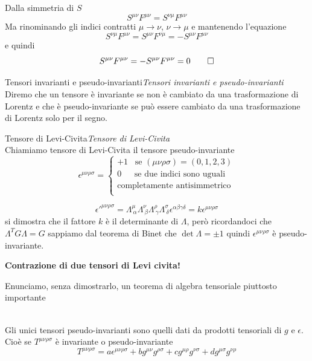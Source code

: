 \documentclass[12pt,a4paper,titlepage, twoside, openright]{book}
\newenvironment{proof:}[1][\proofname]{  %
 \begin{tcolorbox}[
	breakable, 
	enhanced, 
	interior hidden, 
	frame hidden, 
	borderline west = {1pt}{0pt}{gray}, 
	top=0pt, bottom=0pt, left=0pt]
\begin{proof}[#1:]~
}
{
\end{proof}
\end{tcolorbox}
}
\newenvironment{definizione}[1][\empty]{\begin{Definizione}{
\ifx\empty#1\relax\else\mdseries\itshape#1\\\fi
}{}}{\end{Definizione}}
\newenvironment{teorema}[1][\empty]{\begin{Teorema}{
\ifx\empty#1\relax\else\mdseries\itshape#1\\\fi
}{}}{\end{Teorema}}
\numberwithin{equation}{chapter}
\begin{document}
\begin{proof:}
Dalla simmetria di $S$ 
\[
S^{\mu\nu}F^{\mu\nu}=S^{\nu\mu}F^{\mu\nu}
\]
Ma rinominando gli indici contratti $\mu\rightarrow\nu$, $\nu\rightarrow \mu$  e mantenendo l'equazione
\[
S^{\nu\mu}F^{\mu\nu}=S^{\mu\nu}F^{\nu\mu}=-S^{\mu\nu}F^{\mu\nu} 
\]
e quindi
\[
S^{\mu\nu}F^{\mu\nu}=-S^{\mu\nu}F^{\mu\nu}=0 \qedhere 
\]
\end{proof:}

\begin{definizione}[Tensori invarianti e pseudo-invarianti]
Diremo che un tensore è invariante se non è cambiato da una trasformazione di Lorentz e che è pseudo-invariante se può essere cambiato da una trasformazione di Lorentz solo per il segno.
\end{definizione}

\begin{definizione}[Tensore di Levi-Civita]\label{tensore levi civita}
Chiamiamo tensore di Levi-Civita il tensore pseudo-invariante 
\[
\epsilon^{\mu\nu\rho\sigma}=\begin{cases}
+1 \>\>\>\, \text{se } (\mu\nu\rho\sigma)=(0,1,2,3)\\
0 \>\>\>\>\>\>\> \text{se due indici sono uguali}\\
\text{completamente antisimmetrico}\\
\end{cases}
\]
\end{definizione}
\begin{proof:}

\[
\epsilon'^{\mu\nu\rho\sigma}=\Lambda^{\mu}_{\> \alpha}\Lambda^{\nu}_{\> \beta}\Lambda^{\rho}_{\> \gamma}\Lambda^{\sigma}_{\> \delta} \epsilon^{\alpha\beta\gamma\delta} = k \epsilon^{\mu\nu\rho\sigma}
\]
si dimostra che il fattore $k$ è il determinante di $\Lambda$, però ricordandoci che $\Lambda^T G \Lambda=G$ sappiamo dal teorema di Binet che $\det{\Lambda}=\pm 1$ quindi $\epsilon^{\mu\nu\rho\sigma}$ è pseudo-invariante. \qedhere
\end{proof:}

\textbf{Contrazione di due tensori di Levi civita!}

Enunciamo, senza dimostrarlo, un teorema di algebra tensoriale piuttosto importante

\begin{teorema}
Gli unici tensori pseudo-invarianti sono quelli dati da prodotti tensoriali di $g$ e $\epsilon$.
Cioè se $T^{\mu\nu\rho\sigma}$ è invariante o pseudo-invariante 
\[
T^{\mu\nu\rho\sigma} = a \epsilon^{\mu\nu\rho\sigma} + b g^{\mu\nu}g^{\rho\sigma} + c g^{\mu\rho}g^{\nu\sigma} + d g^{\mu\sigma} g^{\nu\rho}
\]
\end{teorema}
\end{document}
